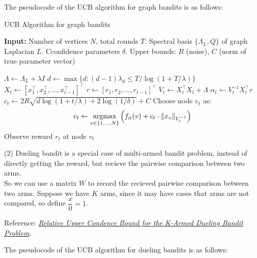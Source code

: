 The pseudocode of the UCB algorithm for graph bandits is as follows:
\begin{algorithm}[h]
    \caption{UCB Algorithm for graph bandits}
    \textbf{Input:} Number of vertices $N$, total rounds $T$. Spectral basis $\{ \Lambda_L, Q \}$ of graph Laplacian $L$. Cconfidence parameters $\delta$. Upper bounds: $R$ (noise), $C$ (norm of true parameter vector)
    \begin{algorithmic}[1]
    \State $\Lambda \gets \Lambda_{L} + \lambda I$
    \State $d \gets \max\{ d : (d-1)\lambda_d \leq T / \log(1 + T/\lambda) \}$ 
        \State $X_t \gets [x_1^\top, x_2^\top, \dots, x_{t-1}^\top]^\top$ 
        \State $r \gets [r_1, r_2, \dots, r_{t-1}]^\top$ 
        \State $V_t \gets X_t^\top X_t + \Lambda$ 
        \State $\hat{\alpha}_t \gets V_t^{-1} X_t^\top r$ 
        \State $c_t \gets 2R \sqrt{d \log(1 + t/\lambda) + 2 \log(1/\delta)} + C$ 
        \State Choose node $v_t$ as:
        \[
            v_t \gets \mathop{\rm argmax}_{v \in \{1, \dots, N\}} \left( f_{\hat{\alpha}}(v) + c_t \cdot \| x_v \|_{V_t^{-1}} \right)
        \]
        \State Observe reward $r_t$ at node $v_t$
    \EndFor
    \end{algorithmic}
\end{algorithm}

(2) Dueling bandit is a special case of multi-armed bandit problem, instead of directly getting the reward, but recieve the pairwise comparison between two arms. \\
So we can use a matrix $W$ to record the recieved pairwise comparison between two arms. Suppose we have $K$ arms, since it may have cases that arms are not compared, so define $\dfrac{x}{0}=1$.

Reference: \href{https://arxiv.org/pdf/1312.3393}{\textit{Relative Upper Condence Bound for the K-Armed Dueling Bandit Problem}}.

The pseudocode of the UCB algorithm for dueling bandits is as follows:

